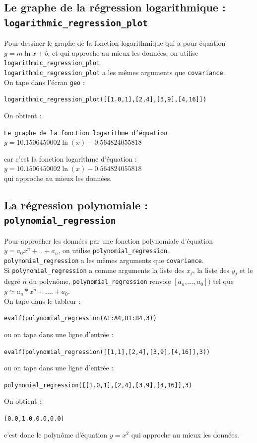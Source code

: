 \documentclass[a4paper,11pt]{book}
\begin{document}
\subsection{Le graphe de la r\'egression logarithmique : {\tt logarithmic\_regression\_plot}}
Pour dessiner le graphe de la fonction logarithmique qui a pour 
\'equation $y=m \ln x+b$, et qui approche au mieux  les donn\'ees, on utilise  
{\tt logarithmic\_regression\_plot}.\\
{\tt logarithmic\_regression\_plot} a les m\^emes arguments que 
{\tt covariance}.\\
On tape dans l'\'ecran {\tt geo} :
\begin{center}{\tt logarithmic\_regression\_plot([[1.0,1],[2,4],[3,9],[4,16]])}\end{center}
On obtient :
\begin{center}{\tt Le graphe de la fonction logarithme d'\'equation $y=10.1506450002\ln(x)-0.564824055818$}\end{center}
car c'est la fonction logarithme d'\'equation :\\
$y=10.1506450002\ln(x)-0.564824055818$ \\
qui approche au mieux les donn\'ees.

\subsection{La r\'egression polynomiale : {\tt polynomial\_regression}}
Pour approcher les donn\'ees par  une fonction polynomiale d'\'equation
$y=a_0x^n+..+a_n$, on utilise  {\tt polynomial\_regression}.\\
{\tt polynomial\_regression} a les m\^emes arguments que {\tt covariance}.\\
Si {\tt polynomial\_regression} a comme arguments la liste des $x_j$, la liste
 des $y_j$ et le degr\'e $n$ du polyn\^ome, {\tt polynomial\_regression}
 renvoie $[a_n,..., a_0])$ tel que $y \simeq a_n*x^n+....+a_0$.\\
On tape dans le tableur :
\begin{center}{\tt evalf(polynomial\_regression(A1:A4,B1:B4,3))}\end{center}
ou on tape dans une ligne d'entr\'ee :
\begin{center}{\tt evalf(polynomial\_regression([[1,1],[2,4],[3,9],[4,16]],3))}\end{center}
ou on tape dans une ligne d'entr\'ee :
\begin{center}{\tt polynomial\_regression([[1.0,1],[2,4],[3,9],[4,16]],3)}\end{center}
On obtient :
\begin{center}{\tt  [0.0,1.0,0.0,0.0]}\end{center}
c'est donc le polyn\^ome d'\'equation $y=x^2$ qui approche au mieux 
les donn\'ees.
\end{document}
